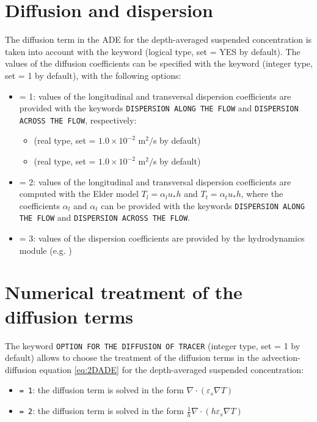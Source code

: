 \section{Diffusion and dispersion}
The diffusion term in the ADE for the depth-averaged suspended concentration is taken into account with the keyword  (logical type, set {\ttfamily = YES} by default). The values of the diffusion coefficients can be specified with the keyword  (integer type, set {\ttfamily = 1} by default), with the following options:
\begin{itemize}
\item {\ttfamily = 1}: values of the longitudinal and transversal dispersion coefficients are provided with the keywords \texttt{DISPERSION ALONG THE FLOW} and \texttt{DISPERSION ACROSS THE FLOW}, respectively:
\begin{itemize}
\item {} (real type, set {\ttfamily = $1.0 \times 10^{-2}$ m$^2/$s} by default)
\item {} (real type, set {\ttfamily = $1.0 \times 10^{-2}$ m$^2/$s} by default)
\end{itemize}
 
\item {\ttfamily = 2}: values of the longitudinal and transversal dispersion coefficients are computed with the Elder model $T_l=\alpha_l u_* h$ and $T_t=\alpha_t u_* h$, where the coefficients $\alpha_l$ and $\alpha_t$ can be provided with the keywords \texttt{DISPERSION ALONG THE FLOW} and \texttt{DISPERSION ACROSS THE FLOW}. 
\item {\ttfamily = 3}: values of the dispersion coefficients are provided by the hydrodynamics module (e.g. )
\end{itemize}

\section{Numerical treatment of the diffusion terms}
The keyword \texttt{OPTION FOR THE DIFFUSION OF TRACER} (integer type, set {\ttfamily = 1} by default) allows to choose the treatment of the diffusion terms in the advection-diffusion equation \ref{eq:2DADE} for the depth-averaged suspended concentration:
\begin{itemize}
\item \texttt{= 1}: the diffusion term is solved in the form $\nabla\cdot(\varepsilon_s\nabla T)$
\item \texttt{= 2}: the diffusion term is solved in the form $\frac{1}{h}\nabla\cdot(h\varepsilon_s\nabla T)$
\end{itemize}

